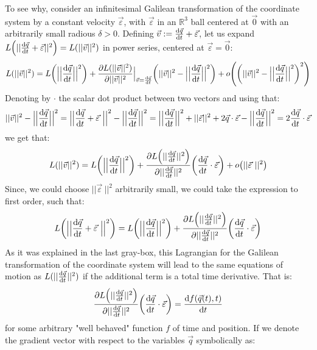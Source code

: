 \documentclass[11pt, a4paper]{article} %
\newcommand{\R}{\mathbb{R}} %
\begin{document}
To see why, consider an infinitesimal Galilean transformation of the coordinate system by a constant velocity $\vec{\varepsilon}$, with $\vec{\varepsilon}$ in an $\R^3$ ball centered at $\vec{0}$ with an arbitrarily small radious $\delta>0$. Defining $\vec{v}:=\dv{\vec{q}}{t}+\vec{\varepsilon}$, let us expand $L\qty( ||\dv{\vec{q}}{t}+\vec{\varepsilon}||^2)=L(||\vec{v}||^2)$ in power series, centered at $\vec{\varepsilon}=\vec{0}$:
\begin{equation}
L(||\vec{v}||^2)=L\qty(\Big|\Big|\dv{\vec{q}}{t}\Big|\Big|^2)+\pdv{L(||\vec{v}||^2)}{||\vec{v}||^2}\Big\rvert_{\vec{v}=\dv{\vec{q}}{t}}\qty(||\vec{v}||^2-\Big|\Big|\dv{\vec{q}}{t}\Big|\Big|^2)+o\qty(\qty(||\vec{v}||^2-\Big|\Big|\dv{\vec{q}}{t}\Big|\Big|^2)^2  )
\end{equation}
Denoting by $\cdot$ the scalar dot product between two vectors and using that:
\begin{equation}
||\vec{v}||^2-\Big|\Big|\dv{\vec{q}}{t}\Big|\Big|^2=\Big|\Big|\dv{\vec{q}}{t}+\vec{\varepsilon}\ \Big|\Big|^2-\Big|\Big|\dv{\vec{q}}{t}\Big|\Big|^2=\Big|\Big|\dv{\vec{q}}{t}\Big|\Big|^2+||\vec{\varepsilon}||^2+2\vec{q}\cdot \vec{\varepsilon}-\Big|\Big|\dv{\vec{q}}{t}\Big|\Big|^2=2\dv{\vec{q}}{t}\cdot \vec{\varepsilon}
\end{equation}
we get that:
\begin{equation}
L(||\vec{v}||^2)=L\qty(\Big|\Big|\dv{\vec{q}}{t}\Big|\Big|^2)+\pdv{L\qty(||\dv{\vec{q}}{t}||^2)}{||\dv{\vec{q}}{t}||^2}\qty(\dv{\vec{q}}{t}\cdot \vec{\varepsilon})+o\qty(||\vec{\varepsilon}\ ||^2  )
\end{equation}
Since, we could choose $||\vec{\varepsilon}\ ||^2$ arbitrarily small, we could take the expression to first order, such that:
\begin{equation}
L\qty(\Big|\Big|\dv{\vec{q}}{t}+\vec{\varepsilon}\ \Big|\Big|^2)=L\qty(\Big|\Big|\dv{\vec{q}}{t}\Big|\Big|^2)+\pdv{L\qty(||\dv{\vec{q}}{t}||^2)}{||\dv{\vec{q}}{t}||^2}\qty(\dv{\vec{q}}{t}\cdot \vec{\varepsilon})
\end{equation}
As it was explained in the last gray-box, this Lagrangian for the Galilean transformation of the coordinate system will lead to the same equations of motion as $L(||\dv{\vec{q}}{t}||^2)$ if the additional term is a total time derivative. That is:
\begin{equation}
\pdv{L\qty(||\dv{\vec{q}}{t}||^2)}{||\dv{\vec{q}}{t}||^2}\qty(\dv{\vec{q}}{t}\cdot \vec{\varepsilon})=\dv{f(\vec{q}(t),t)}{t}
\end{equation}
for some arbitrary "well behaved" function $f$ of time and position. If we denote the gradient vector with respect to the variables $\vec{q}$ symbolically as:
\end{document}

